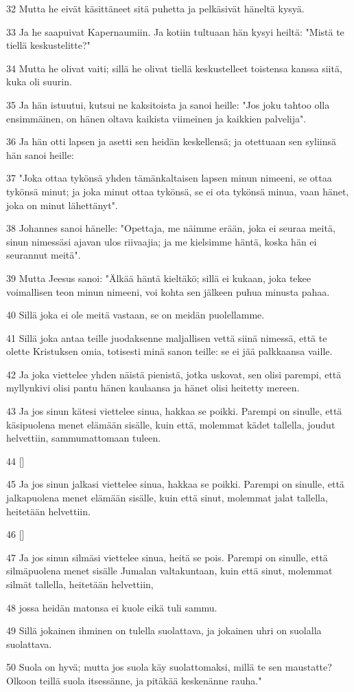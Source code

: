 \par 32 Mutta he eivät käsittäneet sitä puhetta ja pelkäsivät häneltä kysyä.
\par 33 Ja he saapuivat Kapernaumiin. Ja kotiin tultuaan hän kysyi heiltä: "Mistä te tiellä keskustelitte?"
\par 34 Mutta he olivat vaiti; sillä he olivat tiellä keskustelleet toistensa kanssa siitä, kuka oli suurin.
\par 35 Ja hän istuutui, kutsui ne kaksitoista ja sanoi heille: "Jos joku tahtoo olla ensimmäinen, on hänen oltava kaikista viimeinen ja kaikkien palvelija".
\par 36 Ja hän otti lapsen ja asetti sen heidän keskellensä; ja otettuaan sen syliinsä hän sanoi heille:
\par 37 "Joka ottaa tykönsä yhden tämänkaltaisen lapsen minun nimeeni, se ottaa tykönsä minut; ja joka minut ottaa tykönsä, se ei ota tykönsä minua, vaan hänet, joka on minut lähettänyt".
\par 38 Johannes sanoi hänelle: "Opettaja, me näimme erään, joka ei seuraa meitä, sinun nimessäsi ajavan ulos riivaajia; ja me kielsimme häntä, koska hän ei seurannut meitä".
\par 39 Mutta Jeesus sanoi: "Älkää häntä kieltäkö; sillä ei kukaan, joka tekee voimallisen teon minun nimeeni, voi kohta sen jälkeen puhua minusta pahaa.
\par 40 Sillä joka ei ole meitä vastaan, se on meidän puolellamme.
\par 41 Sillä joka antaa teille juodaksenne maljallisen vettä siinä nimessä, että te olette Kristuksen omia, totisesti minä sanon teille: se ei jää palkkaansa vaille.
\par 42 Ja joka viettelee yhden näistä pienistä, jotka uskovat, sen olisi parempi, että myllynkivi olisi pantu hänen kaulaansa ja hänet olisi heitetty mereen.
\par 43 Ja jos sinun kätesi viettelee sinua, hakkaa se poikki. Parempi on sinulle, että käsipuolena menet elämään sisälle, kuin että, molemmat kädet tallella, joudut helvettiin, sammumattomaan tuleen.
\par 44 []
\par 45 Ja jos sinun jalkasi viettelee sinua, hakkaa se poikki. Parempi on sinulle, että jalkapuolena menet elämään sisälle, kuin että sinut, molemmat jalat tallella, heitetään helvettiin.
\par 46 []
\par 47 Ja jos sinun silmäsi viettelee sinua, heitä se pois. Parempi on sinulle, että silmäpuolena menet sisälle Jumalan valtakuntaan, kuin että sinut, molemmat silmät tallella, heitetään helvettiin,
\par 48 jossa heidän matonsa ei kuole eikä tuli sammu.
\par 49 Sillä jokainen ihminen on tulella suolattava, ja jokainen uhri on suolalla suolattava.
\par 50 Suola on hyvä; mutta jos suola käy suolattomaksi, millä te sen maustatte? Olkoon teillä suola itsessänne, ja pitäkää keskenänne rauha."

